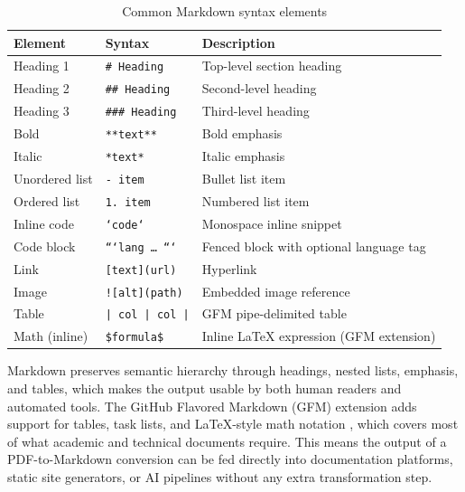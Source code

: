 \documentclass[12pt]{article}
\begin{document}
\begin{table}[h!]
\centering
\caption{Common Markdown syntax elements}
\label{tab:markdown_syntax}
\renewcommand{\arraystretch}{1.4}
\begin{tabularx}{\textwidth}{llX}
\toprule
\textbf{Element} & \textbf{Syntax} & \textbf{Description} \\
\midrule
Heading 1       & \texttt{\# Heading}           & Top-level section heading \\
Heading 2       & \texttt{\#\# Heading}          & Second-level heading \\
Heading 3       & \texttt{\#\#\# Heading}        & Third-level heading \\
Bold            & \texttt{**text**}             & Bold emphasis \\
Italic          & \texttt{*text*}               & Italic emphasis \\
Unordered list  & \texttt{- item}               & Bullet list item \\
Ordered list    & \texttt{1. item}              & Numbered list item \\
Inline code     & \texttt{`code`}               & Monospace inline snippet \\
Code block      & \texttt{```lang \ldots{} ```} & Fenced block with optional language tag \\
Link            & \texttt{[text](url)}          & Hyperlink \\
Image           & \texttt{![alt](path)}         & Embedded image reference \\
Table           & \texttt{| col | col |}        & GFM pipe-delimited table \\
Math (inline)   & \texttt{\$formula\$}          & Inline \LaTeX{} expression (GFM extension) \\
\bottomrule
\end{tabularx}
\end{table}

Markdown preserves semantic hierarchy through headings, nested lists, emphasis,
and tables, which makes the output usable by both human readers and automated
tools. The GitHub Flavored Markdown (GFM) extension adds support for tables,
task lists, and \LaTeX-style math notation \cite{duan2025}, which covers most
of what academic and technical documents require. This means the output of a
PDF-to-Markdown conversion can be fed directly into documentation platforms,
static site generators, or AI pipelines without any extra transformation step.
\end{document}
